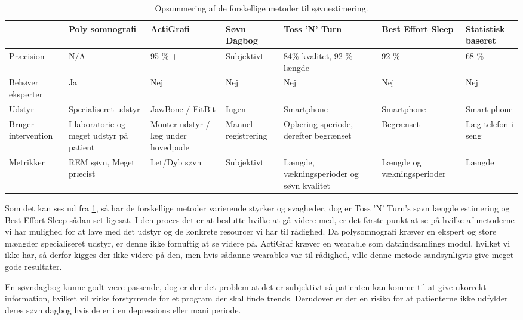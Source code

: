 \begin{table}[h]
\begin{tabular}{|p{1.5cm}|p{2cm}|p{2cm}|p{2cm}|p{2cm}|p{2cm}|p{1.5cm}|}
\hline & Poly somnografi & ActiGrafi & Søvn Dagbog & Toss 'N' Turn & Best Effort Sleep  & Statistisk baseret\\ 
\hline Præcision & N/A & 95 \% + & Subjektivt & 84\% kvalitet, 92 \% længde & 92 \% & 68 \%\\ 
\hline Behøver eksperter & Ja & Nej & Nej & Nej & Nej & Nej \\ 
\hline Udstyr & Specialiseret udstyr & JawBone / FitBit & Ingen & Smartphone & Smartphone & Smart-phone \\ 
\hline Bruger intervention	& I laboratorie og meget udstyr på patient	& Monter udstyr / læg under hovedpude & Manuel registrering  & Oplæring-speriode, derefter begrænset & Begrænset & Læg telefon i seng \\ 
\hline Metrikker & REM søvn, Meget præcist	& Let/Dyb søvn & Subjektivt & Længde, vækningsperioder og søvn kvalitet & Længde og vækningsperioder & Længde \\ 
\hline 
\end{tabular}
\caption{Opsummering af de forskellige metoder til søvnestimering.}
\label{tab:opsummeringMetoder}
\end{table}
Som det kan ses ud fra \cref{tab:opsummeringMetoder}, så har de forskellige metoder varierende styrker og svagheder, dog er Toss 'N' Turn's søvn længde estimering og Best Effort Sleep sådan set ligesat.
I den proces det er at beslutte hvilke at gå videre med, er det første punkt at se på hvilke af metoderne vi har mulighed for at lave med det udstyr og de konkrete resourcer vi har til rådighed.
Da polysomnografi kræver en ekspert og store mængder specialiseret udstyr, er denne ikke fornuftig at se videre på.
ActiGraf kræver en wearable som dataindsamlings modul, hvilket vi ikke har, så derfor kigges der ikke videre på den, men hvis sådanne wearables var til rådighed, ville denne metode sandsynligvis give meget gode resultater.

En søvndagbog kunne godt være passende, dog er der det problem at det er subjektivt så patienten kan komme til at give ukorrekt information, hvilket vil virke forstyrrende for et program der skal finde trends.
Derudover er der en risiko for at patienterne ikke udfylder deres søvn dagbog hvis de er i en depressions eller mani periode.

